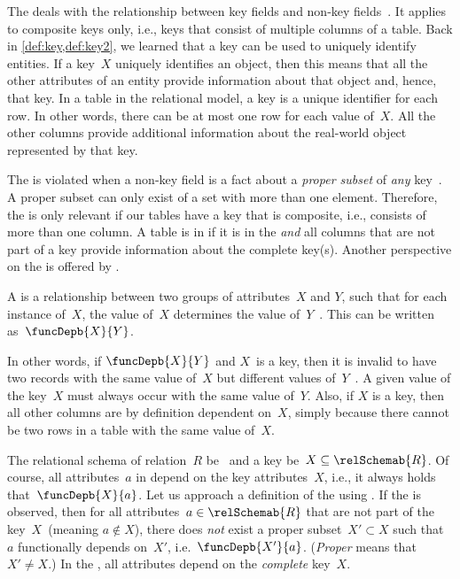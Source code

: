 %
\label{sec:normalForm:2}%
%
The  deals with the relationship between key fields and non-key fields~\cite{C1971FNOTDBRM,C1971NDBSABT,K1983ASGTFNFIRDT,D2003AITDS,EN2015FODS}.
It applies to composite keys only, i.e., keys that consist of multiple columns of a table.
Back in \cref{def:key,def:key2}, we learned that a key can be used to uniquely identify entities.
If a key~$X$ uniquely identifies an object, then this means that all the other attributes of an entity provide information about that object and, hence, that key.
In a table in the relational model, a key is a unique identifier for each row.
In other words, there can be at most one row for each value of~$X$.
All the other columns provide additional information about the real-world object represented by that key.

The  is violated when a non-key field is a fact about a \emph{proper subset} of \emph{any} key~\cite{K1983ASGTFNFIRDT}.
A proper subset can only exist of a set with more than one element.
Therefore, the  is only relevant if our tables have a key that is composite, i.e., consists of more than one column.
A table is in  if it is in the  \emph{and} all columns that are not part of a key provide information about the complete key(s).
Another perspective on the  is offered by .%
%
\begin{definition}%
\label{def:functionalDependency}%
A \emph{} is a relationship between two groups of attributes~$X$ and $Y$, such that for each instance of~$X$, the value of~$X$ determines the value of~$Y$~\cite{S2024D:RNDAFDNF}. %
This can be written as~$\funcDepb{X}{Y}$.%
\end{definition}%
%
In other words, if $\funcDepb{X}{Y}$ and $X$~is a key, then it is invalid to have two records with the same value of~$X$ but different values of~$Y$~\cite{K1983ASGTFNFIRDT}.
A given value of the key~$X$ must always occur with the same value of~$Y$.
Also, if $X$ is a key, then all other columns are by definition dependent on~$X$, simply because there cannot be two rows in a table with the same value of~$X$.

The relational schema of relation~$R$ be~ and a key be~$X\subseteq\relSchemab{R}$.
Of course, all attributes~$a$ in depend on the key attributes~$X$, i.e., it always holds that~$\funcDepb{X}{a}$.
Let us approach a definition of the  using .
If the  is observed, then for all attributes~$a\in\relSchemab{R}$ that are not part of the key~$X$~(meaning $a \not\in X$), there does \emph{not} exist a proper subset~$X'\subset X$ such that~$a$ functionally depends on~$X'$, i.e.~$\funcDepb{X'}{a}$.
(\emph{Proper} means that $X'\neq X$.)
In the , all attributes depend on the \emph{complete} key~$X$.

